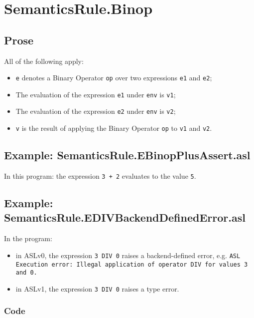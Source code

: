 \documentclass{book}
\begin{document}
\section{SemanticsRule.Binop \label{sec:SemanticsRule.Binop}}

  \subsection{Prose}
  All of the following apply:
  \begin{itemize}
  \item \texttt{e} denotes a Binary Operator \texttt{op} over two expressions \texttt{e1} and \texttt{e2};
  \item The evaluation of the expression \texttt{e1} under \texttt{env} is \texttt{v1};
  \item The evaluation of the expression \texttt{e2} under \texttt{env} is \texttt{v2};
  \item \texttt{v} is the result of applying the Binary Operator \texttt{op} to \texttt{v1} and \texttt{v2}.
  \end{itemize}

  \subsection{Example: SemanticsRule.EBinopPlusAssert.asl}
    In this program:
    the expression \texttt{3 + 2} evaluates to the value \texttt{5}.

  \subsection{Example: SemanticsRule.EDIVBackendDefinedError.asl}
    In the program:
    \begin{itemize}
    \item in ASLv0, the expression \texttt{3 DIV 0} raises a backend-defined
      error, e.g.
      \texttt{ASL Execution error: Illegal application of operator DIV for values 3 and 0.}
    \item in ASLv1, the expression \texttt{3 DIV 0} raises a type error.
    \end{itemize}

  \subsubsection{Code}
\end{document}

